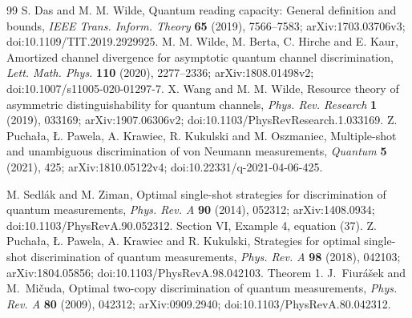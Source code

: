 \begin{thebibliography}{99}
 S. Das and M. M. Wilde,
Quantum reading capacity: General definition and bounds,
\emph{IEEE Trans. Inform. Theory} \textbf{65} (2019), 7566--7583;
arXiv:1703.03706v3; doi:10.1109/TIT.2019.2929925.
 M. M. Wilde, M. Berta, C. Hirche and E. Kaur,
Amortized channel divergence for asymptotic quantum channel discrimination,
\emph{Lett. Math. Phys.} \textbf{110} (2020), 2277--2336;
arXiv:1808.01498v2; doi:10.1007/s11005-020-01297-7.
 X. Wang and M. M. Wilde,
Resource theory of asymmetric distinguishability for quantum channels,
\emph{Phys. Rev. Research} \textbf{1} (2019), 033169;
arXiv:1907.06306v2; doi:10.1103/PhysRevResearch.1.033169.
 Z. Pucha\l a, \L. Pawela, A. Krawiec, R. Kukulski and
M. Oszmaniec, Multiple-shot and unambiguous discrimination of von Neumann
measurements, \emph{Quantum} \textbf{5} (2021), 425;
arXiv:1810.05122v4; doi:10.22331/q-2021-04-06-425.


 M. Sedl\'ak and M. Ziman,
Optimal single-shot strategies for discrimination of quantum measurements,
\emph{Phys. Rev. A} \textbf{90} (2014), 052312;
arXiv:1408.0934; doi:10.1103/PhysRevA.90.052312.
Section VI, Example 4, equation (37).
 Z. Pucha\l a, \L. Pawela, A. Krawiec and R. Kukulski,
Strategies for optimal single-shot discrimination of quantum measurements,
\emph{Phys. Rev. A} \textbf{98} (2018), 042103;
arXiv:1804.05856; doi:10.1103/PhysRevA.98.042103. Theorem 1.
 J.~Fiur\'a\v sek and M.~Mi\v cuda,
Optimal two-copy discrimination of quantum measurements,
\emph{Phys. Rev. A} \textbf{80} (2009), 042312;
arXiv:0909.2940; doi:10.1103/PhysRevA.80.042312.

\end{thebibliography}
